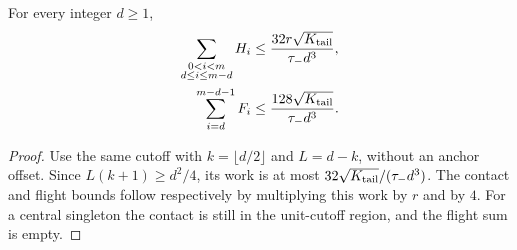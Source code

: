 \begin{corollary}
\label{cor:bl-energy}
For every integer $d\ge1$,
\begin{align}
 \sum_{\substack{0<i<m\\d\le i\le m-d}}H_i
 &\le\frac{32r\sqrt{K_{\rm tail}}}{\tau_-d^3},
                                      \label{eq:bl-contact-tail}\\
 \sum_{i=d}^{m-d-1}F_i
 &\le\frac{128\sqrt{K_{\rm tail}}}{\tau_-d^3}.
                                      \label{eq:bl-flight-tail}
\end{align}
\end{corollary}
\begin{proof}
Use the same cutoff with $k=\lfloor d/2\rfloor$ and $L=d-k$,
without an anchor offset.  Since $L(k+1)\ge d^2/4$, its work is
at most $32\sqrt{K_{\rm tail}}/(\tau_-d^3)$.
The contact and flight bounds follow respectively by multiplying
this work by $r$ and by $4$.  For a central singleton the contact
is still in the unit-cutoff region, and the flight sum is empty.
\end{proof}
